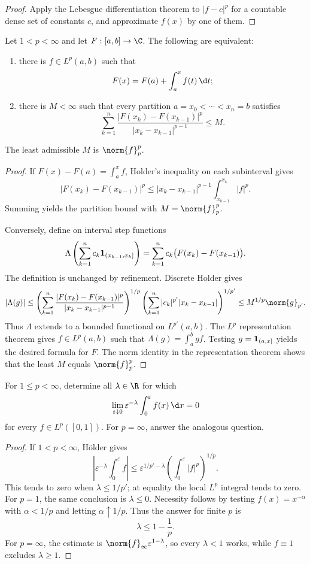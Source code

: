 \begin{proof}
Apply the Lebesgue differentiation theorem to $|f-c|^p$ for a countable dense set of constants $c$, and approximate $f(x)$ by one of them.
\end{proof}

\begin{thm}
Let $1<p<\infty$ and let $F:[a,b]\to\C$. The following are equivalent:
\begin{enumerate}
  \item there is $f\in L^p(a,b)$ such that
  \[
  F(x)=F(a)+\int_a^xf(t)\,\d t;
  \]
  \item there is $M<\infty$ such that every partition $a=x_0<\cdots<x_n=b$ satisfies
  \[
  \sum_{k=1}^n
  \frac{|F(x_k)-F(x_{k-1})|^p}{|x_k-x_{k-1}|^{p-1}}
  \leq M.
  \]
\end{enumerate}
The least admissible $M$ is $\norm{f}_p^p$.
\end{thm}

\begin{proof}
If $F(x)-F(a)=\int_a^xf$, Holder's inequality on each subinterval gives
\[
|F(x_k)-F(x_{k-1})|^p
\leq |x_k-x_{k-1}|^{p-1}
\int_{x_{k-1}}^{x_k}|f|^p.
\]
Summing yields the partition bound with $M=\norm{f}_p^p$.

Conversely, define on interval step functions
\[
\Lambda\left(\sum_{k=1}^nc_k\mathbf{1}_{(x_{k-1},x_k]}\right)
 =\sum_{k=1}^nc_k\bigl(F(x_k)-F(x_{k-1})\bigr).
\]
The definition is unchanged by refinement. Discrete Holder gives
\[
|\Lambda(g)|
\leq
\left(\sum_{k=1}^n
\frac{|F(x_k)-F(x_{k-1})|^p}{|x_k-x_{k-1}|^{p-1}}
\right)^{1/p}
\left(\sum_{k=1}^n|c_k|^{p'}|x_k-x_{k-1}|\right)^{1/p'}
\leq M^{1/p}\norm{g}_{p'}.
\]
Thus $\Lambda$ extends to a bounded functional on $L^{p'}(a,b)$. The $L^p$ representation theorem gives $f\in L^p(a,b)$ such that $\Lambda(g)=\int_a^bgf$. Testing $g=\mathbf{1}_{(a,x]}$ yields the desired formula for $F$. The norm identity in the representation theorem shows that the least $M$ equals $\norm{f}_p^p$.
\end{proof}

\begin{exercise}
For $1\leq p<\infty$, determine all $\lambda\in\R$ for which
\[
\lim_{\varepsilon\downarrow0}
\varepsilon^{-\lambda}\int_0^\varepsilon f(x)\,\d x=0
\]
for every $f\in L^p([0,1])$. For $p=\infty$, answer the analogous question.
\end{exercise}

\begin{proof}
If $1<p<\infty$, Hölder gives
\[
\left|\varepsilon^{-\lambda}\int_0^\varepsilon f\right|
\leq \varepsilon^{1/p'-\lambda}
\left(\int_0^\varepsilon|f|^p\right)^{1/p}.
\]
This tends to zero when $\lambda\leq1/p'$; at equality the local $L^p$ integral tends to zero. For $p=1$, the same conclusion is $\lambda\leq0$. Necessity follows by testing $f(x)=x^{-\alpha}$ with $\alpha<1/p$ and letting $\alpha\uparrow1/p$. Thus the answer for finite $p$ is
\[
\lambda\leq1-\frac1p.
\]
For $p=\infty$, the estimate is $\norm{f}_\infty\varepsilon^{1-\lambda}$, so every $\lambda<1$ works, while $f\equiv1$ excludes $\lambda\geq1$.
\end{proof}

